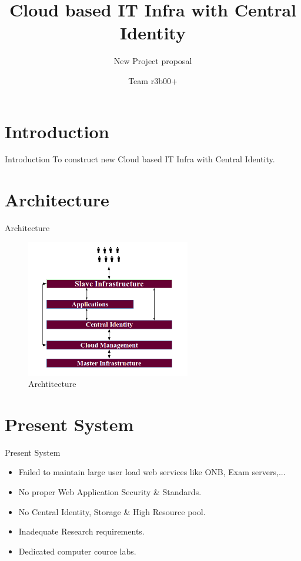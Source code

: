 \documentclass[xcolor=dvipsnames]{beamer}
\title[Cloud based IT Infra with Central Identity]{Cloud based IT Infra with Central Identity}
\subtitle{New Project proposal}
\author{Team r3b00+}
\begin{document}
\begin{frame}
\titlepage
\end{frame}




\section{Introduction}
\begin{frame}{Introduction}
To construct new Cloud based IT Infra with Central Identity.
\end{frame}

\section{Architecture}
\begin{frame}{Architecture}
\begin{figure}[H]
 \includegraphics[height=6cm]{./idea.png}
 \caption{Archtitecture \label{fig:idea}}
\end{figure}
\end{frame}


\section{Present System}
\begin{frame}{Present System}

\begin{itemize}
	\item Failed to maintain large user load web services like ONB, Exam servers,...
	\item No proper Web Application Security \& Standards.
	\item No Central Identity, Storage \& High Resource pool.
	\item Inadequate Research requirements.
	\item Dedicated computer cource labs. 
\end{itemize}

\end{frame}
\end{document}
